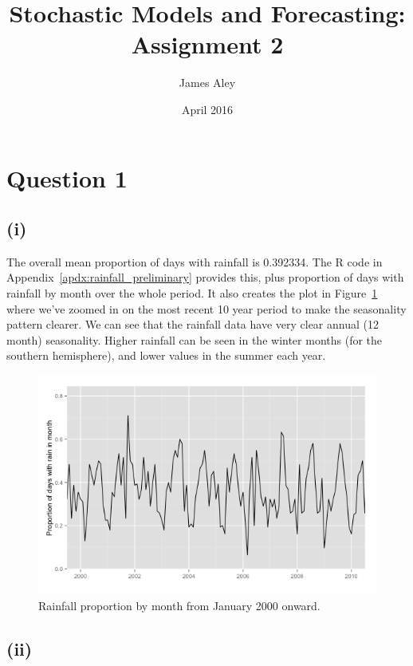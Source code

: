 \documentclass{article}
\title{Stochastic Models and Forecasting: Assignment 2}
\author{James Aley}
\date{April 2016}
\begin{document}
\maketitle

\section*{Question 1}

\subsection*{(i)}

The overall mean proportion of days with rainfall is 0.392334. The
R code in Appendix~\ref{apdx:rainfall_preliminary} provides this, plus
proportion of days with rainfall by month over the whole period. It
also creates the plot in Figure~\ref{fig:rainfall_10years} where we've
zoomed in on the most recent 10 year period to make the seasonality
pattern clearer. We can see that the rainfall data have very clear
annual (12 month) seasonality. Higher rainfall can be seen in the
winter months (for the southern hemisphere), and lower values in the
summer each year.

\begin{figure}
  \includegraphics[width=\textwidth]{rainfall_10years}
  \caption{Rainfall proportion by month from January 2000 onward.}\label{fig:rainfall_10years}
  \centering
\end{figure}

\subsection*{(ii)}
\end{document}
